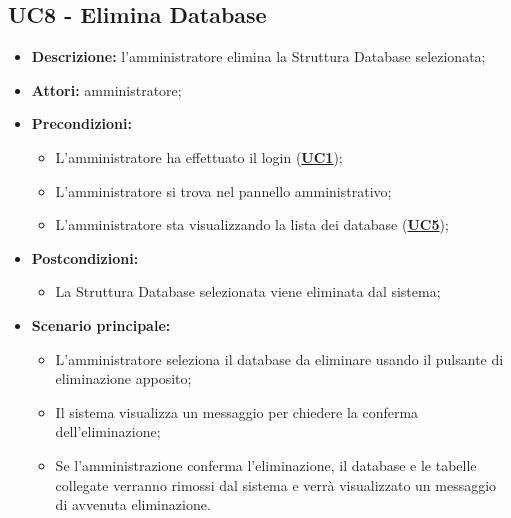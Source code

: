 \subsection{UC8 - Elimina Database}
\label{sec:UC8}
\begin{itemize}
	\item \textbf{Descrizione:} l’amministratore elimina la Struttura Database selezionata;
	\item \textbf{Attori:} amministratore;
	\item \textbf{Precondizioni:} 
	\begin{itemize}
		\item L’amministratore ha effettuato il login (\hyperref[sec:UC1]{\textbf{UC1}});
		\item L’amministratore si trova nel pannello amministrativo;
		\item L’amministratore sta visualizzando la lista dei database (\hyperref[sec:UC5]{\textbf{UC5}});
	\end{itemize}
	\item \textbf{Postcondizioni:} 
	\begin{itemize}
		\item La Struttura Database selezionata viene eliminata dal sistema;
	\end{itemize}
	\item \textbf{Scenario principale:} 
	\begin{itemize}
		\item L'amministratore seleziona il database da eliminare usando il pulsante di eliminazione apposito;
		\item Il sistema visualizza un messaggio per chiedere la conferma dell'eliminazione;
		\item Se l'amministrazione conferma l'eliminazione, il database e le tabelle collegate verranno rimossi dal sistema e verrà visualizzato un messaggio di avvenuta eliminazione.
	\end{itemize}
\end{itemize}

